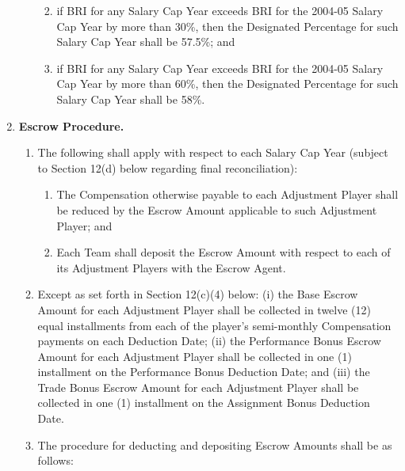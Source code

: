\documentclass[
]{book}
\providecommand{\tightlist}{%
  \setlength{\itemsep}{0pt}\setlength{\parskip}{0pt}}
\begin{document}
\begin{enumerate}
\begin{enumerate}
    \begin{enumerate}
    \def\labelenumiii{(\roman{enumiii})}
    \tightlist
    \item
      if BRI for any Salary Cap Year exceeds BRI for the 2004-05 Salary Cap Year by more than 30\%, then the Designated Percentage for such Salary Cap Year shall be 57.5\%; and
    \item
      if BRI for any Salary Cap Year exceeds BRI for the 2004-05 Salary Cap Year by more than 60\%, then the Designated Percentage for such Salary Cap Year shall be 58\%.
    \end{enumerate}
  \end{enumerate}
\item
  \textbf{Escrow Procedure.}

  \begin{enumerate}
  \def\labelenumii{(\arabic{enumii})}
  \tightlist
  \item
    The following shall apply with respect to each Salary Cap Year (subject to Section 12(d) below regarding final reconciliation):

    \begin{enumerate}
    \def\labelenumiii{(\roman{enumiii})}
    \tightlist
    \item
      The Compensation otherwise payable to each Adjustment Player shall be reduced by the Escrow Amount applicable to such Adjustment Player; and
    \item
      Each Team shall deposit the Escrow Amount with respect to each of its Adjustment Players with the Escrow Agent.
    \end{enumerate}
  \item
    Except as set forth in Section 12(c)(4) below: (i) the Base Escrow Amount for each Adjustment Player shall be collected in twelve (12) equal installments from each of the player's semi-monthly Compensation payments on each Deduction Date; (ii) the Performance Bonus Escrow Amount for each Adjustment Player shall be collected in one (1) installment on the Performance Bonus Deduction Date; and (iii) the Trade Bonus Escrow Amount for each Adjustment Player shall be collected in one (1) installment on the Assignment Bonus Deduction Date.
  \item
    The procedure for deducting and depositing Escrow Amounts shall be as follows:


\end{enumerate}
\end{enumerate}
\end{document}
